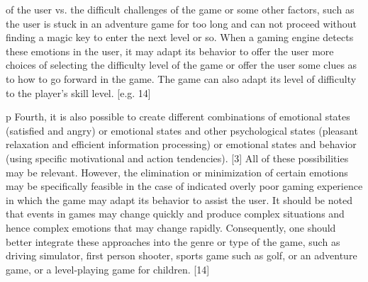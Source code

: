 of the user vs. the difficult challenges of the game or some other factors, such as the user is stuck in an adventure game for too long and can not proceed without finding a magic key to enter the next level or so. When a gaming engine detects these emotions in the user, it may adapt its behavior to offer the user more choices of selecting the difficulty level of the game or offer the user some clues as to how to go forward in the game. The game can also adapt its level of difficulty to the player’s skill level. [e.g. 14] 

p Fourth, it is also possible to create different combinations of emotional states (satisfied and angry) or emotional states and other psychological states (pleasant relaxation and efficient information processing) or emotional states and behavior (using specific motivational and action tendencies). [3]  All of these possibilities may be relevant. However, the elimination or minimization of certain emotions may be specifically feasible in the case of indicated overly poor gaming experience in which the game may adapt its behavior to assist the user. It should be noted that events in games may change quickly and produce complex situations and hence complex emotions that may change rapidly. Consequently, one should better integrate these approaches into the genre or type of the game, such as driving simulator, first person shooter, sports game such as golf, or an adventure game, or a level-playing game for children. [14] 

